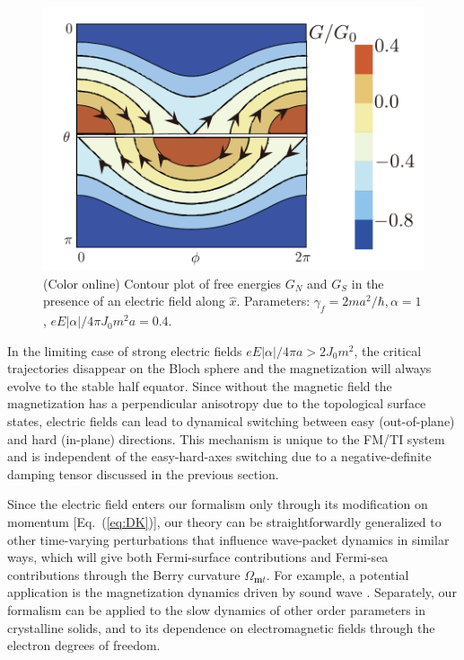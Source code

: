 \documentclass[aps,prb,twocolumn,showpacs,superscriptaddress]{revtex4-1}
\begin{document}
\begin{figure}[!htb]
\begin{center}
	\includegraphics[width=2.6 in]{figure2.pdf}
\end{center} 
\caption{(Color online)    Contour plot of free energies $G_N$ and $G_S$ in the presence of an electric field along $\hat{x}$. Parameters: $\gamma_f = 2ma^2/\hbar, \alpha = 1$, $eE|\alpha|/4\pi J_0 m^2 a = 0.4$.}
\label{fig:2}
\end{figure} 

In the limiting case of strong electric fields ${eE|\alpha|}/{4\pi a} > 2J_0 m^2$, the critical trajectories disappear on the Bloch sphere and the magnetization will always evolve to the stable half equator. Since without the magnetic field the magnetization has a perpendicular anisotropy due to the topological surface states, electric fields can lead to dynamical switching between easy (out-of-plane) and hard (in-plane) directions. This mechanism is unique to the FM/TI system and is independent of the easy-hard-axes switching due to a negative-definite damping tensor discussed in the previous section. 

Since the electric field enters our formalism only through its modification on momentum [Eq.~(\ref{eq:DK})], our theory can be straightforwardly generalized to other time-varying perturbations that influence wave-packet dynamics in similar ways, which will give both Fermi-surface contributions and Fermi-sea contributions through the Berry curvature $\Omega_{\bm{m}t}$. For example, a potential application is the magnetization dynamics driven by sound wave \cite{scherbakov:2010aa,weiler:2011aa}.  Separately, our formalism can be applied to the slow dynamics of other order parameters in crystalline solids, and to its dependence on electromagnetic fields through the electron degrees of freedom.
 
\end{document}
